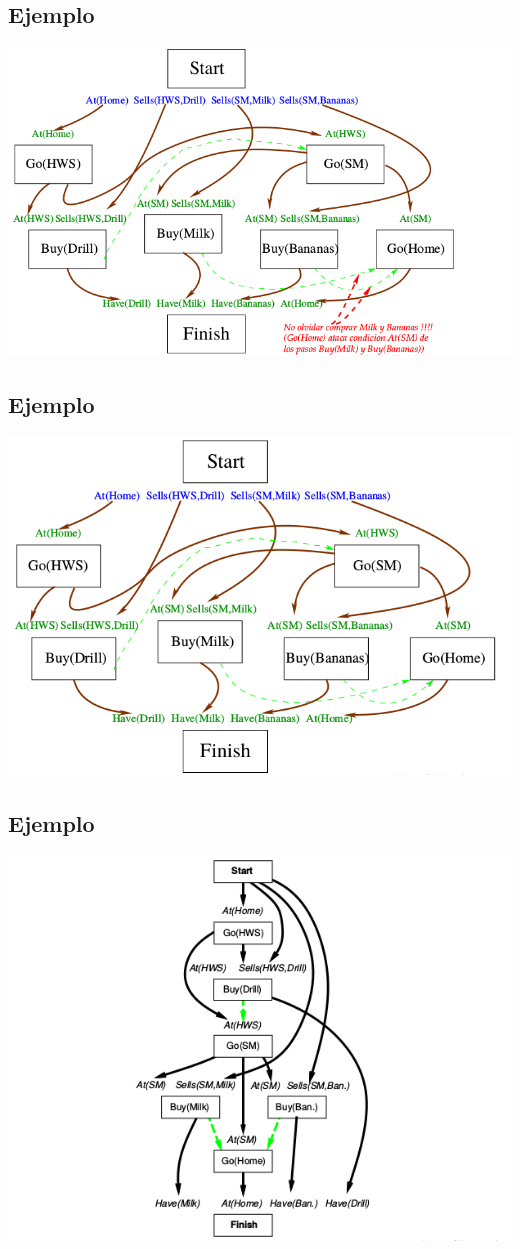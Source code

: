 \documentclass[11pt]{article}
\begin{document}
\subsection*{Ejemplo}
\label{sec:orga8a0f38}

\begin{center}
\includegraphics[width=.9\linewidth]{imagenes/pop23.png}
\end{center}

\subsection*{Ejemplo}
\label{sec:org662d4e8}

\begin{center}
\includegraphics[width=.9\linewidth]{imagenes/pop24.png}
\end{center}

\subsection*{Ejemplo}
\label{sec:org1fb8e56}

\begin{center}
\includegraphics[width=.9\linewidth]{imagenes/pop25.png}
\end{center}
\end{document}
